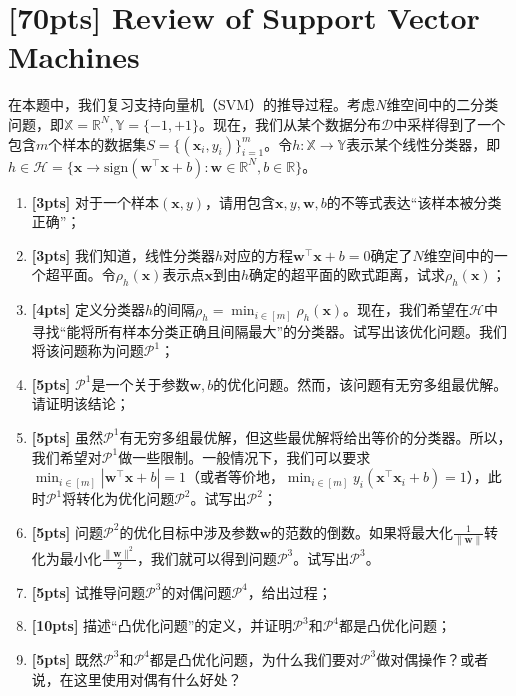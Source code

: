 \documentclass[a4paper,UTF8]{article}
\theoremstyle{definition}
\begin{document}
\section{[70pts] Review of Support Vector Machines}
在本题中，我们复习支持向量机（SVM）的推导过程。考虑$N$维空间中的二分类问题，即$\mathbb{X}=\mathbb{R}^{N},\mathbb{Y}=\{-1,+1\}$。现在，我们从某个数据分布$\mathcal{D}$中采样得到了一个包含$m$个样本的数据集$S=\{(\mathbf{x}_i,y_i)\}_{i=1}^{m}$。令$h:\mathbb{X}\rightarrow\mathbb{Y}$表示某个线性分类器，即$h\in\mathcal{H}=\{\mathbf{x}\rightarrow \mathrm{sign}(\mathbf{w}^\top\mathbf{x}+b):\mathbf{w}\in\mathbb{R}^{N},b\in\mathbb{R}\}$。
\begin{enumerate}[(1)]
\item \textbf{[3pts]} 对于一个样本$(\mathbf{x},y)$，请用包含$\mathbf{x},y,\mathbf{w},b$的不等式表达“该样本被分类正确”；
\item \textbf{[3pts]} 我们知道，线性分类器$h$对应的方程$\mathbf{w}^\top\mathbf{x}+b=0$确定了$N$维空间中的一个超平面。令$\rho_h(\mathbf{x})$表示点$\mathbf{x}$到由$h$确定的超平面的欧式距离，试求$\rho_h(\mathbf{x})$；
\item \textbf{[4pts]} 定义分类器$h$的间隔$\rho_h=\min_{i\in[m]}\rho_h(\mathbf{x})$。现在，我们希望在$\mathcal{H}$中寻找“能将所有样本分类正确且间隔最大”的分类器。试写出该优化问题。我们将该问题称为问题$\mathcal{P}^{1}$；
\item \textbf{[5pts]} $\mathcal{P}^{1}$是一个关于参数$\mathbf{w},b$的优化问题。然而，该问题有无穷多组最优解。请证明该结论；
\item \textbf{[5pts]} 虽然$\mathcal{P}^{1}$有无穷多组最优解，但这些最优解将给出等价的分类器。所以，我们希望对$\mathcal{P}^{1}$做一些限制。一般情况下，我们可以要求$\min_{i\in[m]}|\mathbf{w}^\top\mathbf{x}+b|=1$（或者等价地，$\min_{i\in[m]}y_i(\mathbf{x}^\top\mathbf{x}_i+b)=1$），此时$\mathcal{P}^{1}$将转化为优化问题$\mathcal{P}^{2}$。试写出$\mathcal{P}^{2}$；
\item \textbf{[5pts]} 问题$\mathcal{P}^{2}$的优化目标中涉及参数$\mathbf{w}$的范数的倒数。如果将最大化$\frac{1}{\|\mathbf{w}\|}$转化为最小化$\frac{\|\mathbf{w}\|^2}{2}$，我们就可以得到问题$\mathcal{P}^{3}$。试写出$\mathcal{P}^{3}$。
\item \textbf{[5pts]} 试推导问题$\mathcal{P}^{3}$的对偶问题$\mathcal{P}^{4}$，给出过程；
\item \textbf{[10pts]} 描述“凸优化问题”的定义，并证明$\mathcal{P}^{3}$和$\mathcal{P}^{4}$都是凸优化问题；
\item \textbf{[5pts]} 既然$\mathcal{P}^{3}$和$\mathcal{P}^{4}$都是凸优化问题，为什么我们要对$\mathcal{P}^{3}$做对偶操作？或者说，在这里使用对偶有什么好处？

\end{enumerate}
\end{document}
